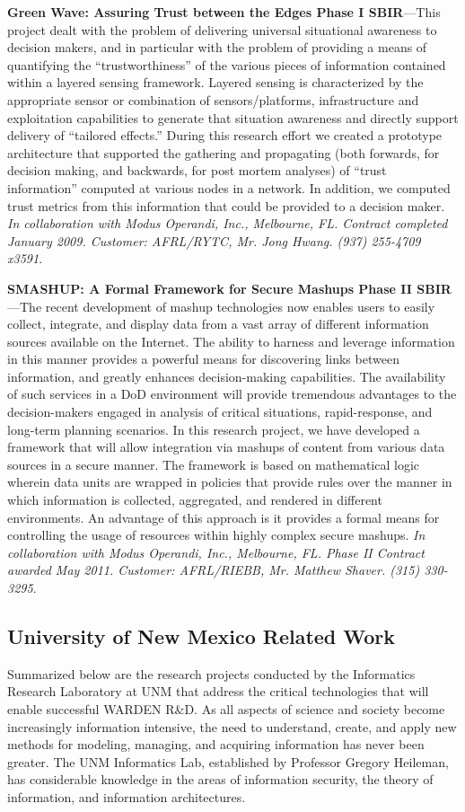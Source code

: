 \documentclass{sbir}
\begin{document}
{\bf Green Wave: Assuring Trust between the Edges Phase I SBIR}---This project dealt with the problem of delivering universal situational awareness to decision makers, and in particular with the problem of providing a means of quantifying the ``trustworthiness'' of the various pieces of information contained within a layered sensing framework. Layered sensing is characterized by the appropriate sensor or combination of sensors/platforms, infrastructure and exploitation capabilities to generate that situation awareness and directly support delivery of ``tailored effects.'' During this research effort we created a prototype architecture that supported the gathering and propagating (both forwards, for decision making, and backwards, for post mortem analyses) of ``trust information'' computed at various nodes in a network. In addition, we computed trust metrics from this information that could be provided to a decision maker. \emph{In collaboration with Modus Operandi, Inc., Melbourne, FL. Contract completed January 2009. Customer: AFRL/RYTC, Mr. Jong Hwang. (937) 255-4709 x3591}.

{\bf SMASHUP: A Formal Framework for Secure Mashups Phase II SBIR}---The recent development of mashup technologies now enables users to easily collect, integrate, and display data from a vast array of different information sources available on the Internet. The ability to harness and leverage information in this manner provides a powerful means for discovering links between information, and greatly enhances decision-making capabilities. The availability of such services in a DoD environment will provide tremendous advantages to the decision-makers engaged in analysis of critical situations, rapid-response, and long-term planning scenarios. In this research project, we have developed a framework that will allow integration via mashups of content from various data sources in a secure manner. The framework is based on mathematical logic wherein data units are wrapped in policies that provide rules over the manner in which information is collected, aggregated, and rendered in different environments. An advantage of this approach is it provides a formal means for controlling the usage of resources within highly complex secure mashups. \emph{In collaboration with Modus Operandi, Inc., Melbourne, FL. Phase II Contract awarded May 2011. Customer: AFRL/RIEBB, Mr. Matthew Shaver. (315) 330-3295}.

\subsection{University of New Mexico Related Work}
Summarized below are the research projects conducted by the Informatics Research Laboratory at UNM that address the critical technologies that will enable successful WARDEN R\&D. As all aspects of science and society become increasingly information intensive, the need to understand, create, and apply new methods for modeling, managing, and acquiring information has never been greater. The UNM Informatics Lab, established by Professor Gregory Heileman, has considerable knowledge in the areas of information security, the theory of information, and information architectures.
\end{document}
